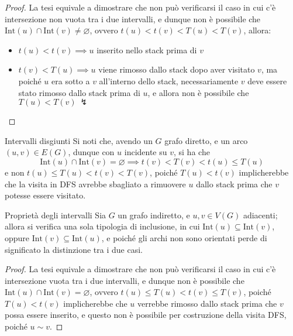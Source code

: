 \documentclass[a4paper, 12pt]{report}
\begin{document}
    \begin{proof}
        La tesi equivale a dimostrare che non può verificarsi il caso in cui c'è intersezione  non vuota tra i due intervalli, e dunque non è possibile che $\mathrm{Int}(u) \cap \mathrm{Int}(v) \neq \varnothing$, ovvero $t(u) < t(v) < T(u) < T(v)$, allora:

        \begin{itemize}
            \item $t(u) < t(v) \implies u$ inserito nello stack prima di $v$
            \item $t(v) < T(u) \implies u$ viene rimosso dallo stack dopo aver visitato $v$, ma poiché $u$ era sotto a $v$ all'interno dello stack, necessariamente $v$ deve essere stato rimosso dallo stack prima di $u$, e allora non è possibile che $T(u) < T(v) \ \lightning$
        \end{itemize}
    \end{proof}

    \begin{framedobs}{Intervalli disgiunti}
        Si noti che, avendo un $G$ grafo diretto, e un arco $(u, v) \in E(G)$, dunque con $u$ incidente su $v$, si ha che $$\mathrm{Int}(u) \cap \mathrm{Int}(v) = \varnothing \implies t(v) < T(v) < t(u) \le T(u)$$ e non $t(u) \le T(u) < t(v) < T(v)$, poiché $T(u) < t(v)$ implicherebbe che la visita in DFS avrebbe sbagliato a rimuovere $u$ dallo stack prima che $v$ potesse essere visitato.
    \end{framedobs}

    \begin{framedlem}{Proprietà degli intervalli}
        Sia $G$ un grafo indiretto, e $u, v \in V(G)$ adiacenti; allora si verifica una sola tipologia di inclusione, in cui $\mathrm{Int}(u) \subseteq \mathrm{Int}(v)$, oppure $\mathrm{Int}(v) \subseteq \mathrm{Int}(u)$, e poiché gli archi non sono orientati perde di significato la distinzione tra i due casi.
    \end{framedlem}

    \begin{proof}
        La tesi equivale a dimostrare che non può verificarsi il caso in cui c'è intersezione vuota tra i due intervalli, e dunque non è possibile che $\mathrm{Int}(u) \cap \mathrm{Int}(v) = \varnothing$, ovvero $t(u) \le T(u) < t(v) \le T(v)$, poiché $T(u) < t(v)$ implicherebbe che $u$ verrebbe rimosso dallo stack prima che $v$ possa essere inserito, e questo non è possibile per costruzione della visita DFS, poiché $u \sim v$.
    \end{proof}
\end{document}
